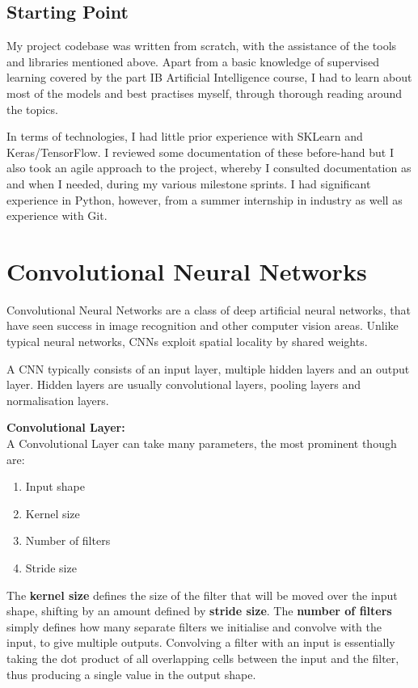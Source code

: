 \documentclass[12pt,a4paper,twoside]{report}
\begin{document}
\subsection{Starting Point}

My project codebase was written from scratch, with the assistance of the tools and libraries mentioned above. Apart from a basic knowledge of supervised learning covered by the part IB Artificial Intelligence course, I had to learn about most of the models and best practises myself, through thorough reading around the topics. 


In terms of technologies, I had little prior experience with SKLearn and Keras/TensorFlow. I reviewed some documentation of these before-hand but I also took an agile approach to the project, whereby I consulted documentation as and when I needed, during my various milestone sprints. I had significant experience in Python, however, from a summer internship in industry as well as experience with Git.


\section{Convolutional Neural Networks}
Convolutional Neural Networks are a class of deep artificial neural networks, that have seen success in image recognition and other computer vision areas. Unlike typical neural networks, CNNs exploit spatial locality by shared weights. 

A CNN typically consists of an input layer, multiple hidden layers and an output layer. Hidden layers are usually convolutional layers, pooling layers and normalisation layers. 

\textbf{Convolutional Layer:}\\
A Convolutional Layer can take many parameters, the most prominent though are: 
\begin{enumerate}
  \item Input shape
  \item Kernel size
  \item Number of filters
  \item Stride size
\end{enumerate}

The \textbf{kernel size} defines the size of the filter that will be moved over the input shape, shifting by an amount defined by \textbf{stride size}. The \textbf{number of filters} simply defines how many separate filters we initialise and convolve with the input, to give multiple outputs. Convolving a filter with an input is essentially taking the dot product of all overlapping cells between the input and the filter, thus producing a single value in the output shape. 
\end{document}
